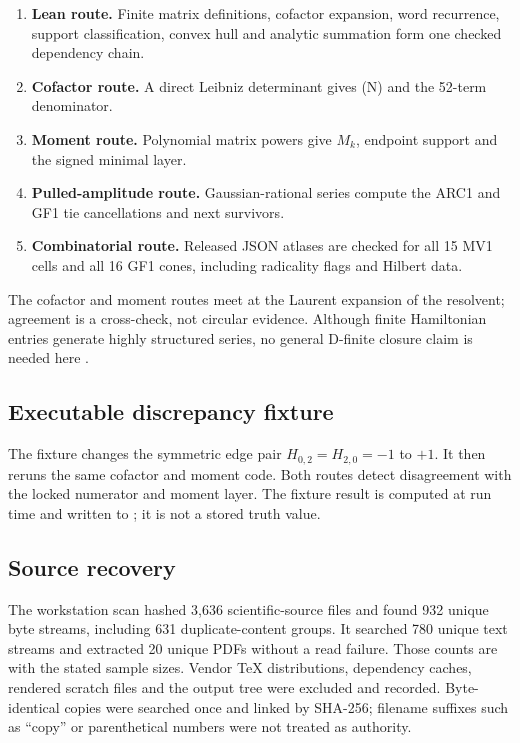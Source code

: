 \begin{enumerate}[label=\arabic*.]
\item \textbf{Lean route.}  Finite matrix definitions, cofactor expansion,
      word recurrence, support classification, convex hull and analytic
      summation form one checked dependency chain.
\item \textbf{Cofactor route.}  A direct Leibniz determinant gives (N) and the
      52-term denominator.
\item \textbf{Moment route.}  Polynomial matrix powers give $M_k$, endpoint
      support and the signed minimal layer.
\item \textbf{Pulled-amplitude route.}  Gaussian-rational series compute the
      ARC1 and GF1 tie cancellations and next survivors.
\item \textbf{Combinatorial route.}  Released JSON atlases are checked for all
      15 MV1 cells and all 16 GF1 cones, including radicality flags and Hilbert
      data.
\end{enumerate}
The cofactor and moment routes meet at the Laurent expansion of the resolvent;
agreement is a cross-check, not circular evidence.  Although finite
Hamiltonian entries generate highly structured series, no general D-finite
closure claim is needed here \parencite{Stanley1980}.

\subsection{Executable discrepancy fixture}

The fixture changes the symmetric edge pair
$H_{0,2}=H_{2,0}=-1$ to $+1$.  It then reruns the same cofactor and moment
code.  Both routes detect disagreement with the locked numerator and moment
layer.  The fixture result is computed at run time and written to
; it is not a stored truth value.

\subsection{Source recovery}

The workstation scan hashed 3,636 scientific-source files and found 932 unique
byte streams, including 631 duplicate-content groups.  It searched 780 unique
text streams and extracted 20 unique PDFs without a read failure.  Those counts
are  with the stated sample sizes.  Vendor TeX
distributions, dependency caches, rendered scratch files and the output tree
were excluded and recorded.  Byte-identical copies were searched once and
linked by SHA-256; filename suffixes such as ``copy'' or parenthetical numbers
were not treated as authority.

